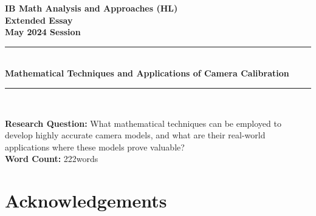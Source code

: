 \documentclass[12pt, oneside]{article}
\providecommand{\wordcount}{222}
\begin{document}
\pagestyle{frontmatter}

\begin{titlepage}
    \large

    \begin{center}

        \vspace*{2cm}

        {\bfseries
            IB Math Analysis and Approaches (HL) \\
            Extended Essay\\
            May 2024 Session}\\

        \vspace*{\fill}

        \rule{\linewidth}{1.5pt} \\ [0.5cm]
        {\LARGE \bfseries Mathematical Techniques and Applications of Camera Calibration }
        \rule{\linewidth}{0.5pt} \\

        \vspace*{\fill}

        \textbf{Research Question:} What mathematical techniques can be employed to develop highly accurate camera models, and what are their real-world applications where these models prove valuable? \\ [1cm]

        \textbf{Word Count:} \wordcount \space words

        \vspace*{2cm}

    \end{center}

\end{titlepage}

\tableofcontents
\clearpage
\pagestyle{mainmatter}
\setcounter{page}{1}










\section*{Acknowledgements}
\end{document}
